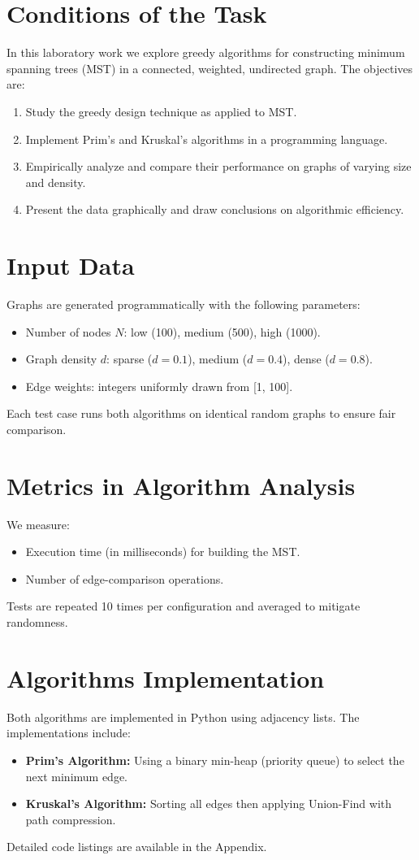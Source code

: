 \documentclass[12pt]{article}
\begin{document}
\section*{Conditions of the Task}
In this laboratory work we explore greedy algorithms for constructing minimum spanning trees (MST) in a connected, weighted, undirected graph. The objectives are:
\begin{enumerate}
    \item Study the greedy design technique as applied to MST.
    \item Implement Prim's and Kruskal's algorithms in a programming language.
    \item Empirically analyze and compare their performance on graphs of varying size and density.
    \item Present the data graphically and draw conclusions on algorithmic efficiency.
\end{enumerate}

\section*{Input Data}
Graphs are generated programmatically with the following parameters:
\begin{itemize}
  \item Number of nodes $N$: low (100), medium (500), high (1000).
  \item Graph density $d$: sparse ($d=0.1$), medium ($d=0.4$), dense ($d=0.8$).
  \item Edge weights: integers uniformly drawn from [1, 100].
\end{itemize}
Each test case runs both algorithms on identical random graphs to ensure fair comparison.

\clearpage
\section*{Metrics in Algorithm Analysis}
We measure:
\begin{itemize}
  \item Execution time (in milliseconds) for building the MST.
  \item Number of edge-comparison operations.
\end{itemize}
Tests are repeated 10 times per configuration and averaged to mitigate randomness.

\section*{Algorithms Implementation}
Both algorithms are implemented in Python using adjacency lists. The implementations include:
\begin{itemize}
  \item \textbf{Prim's Algorithm:} Using a binary min-heap (priority queue) to select the next minimum edge.
  \item \textbf{Kruskal's Algorithm:} Sorting all edges then applying Union-Find with path compression.
\end{itemize}
Detailed code listings are available in the Appendix.
\end{document}
